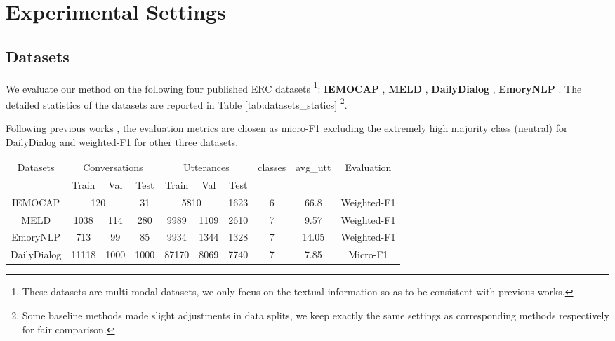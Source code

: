 \documentclass[letterpaper]{article} \usepackage{aaai22}  \usepackage{times}  \usepackage{helvet}  \usepackage{courier}  \usepackage[hyphens]{url}  \usepackage{graphicx} \urlstyle{rm} \def\UrlFont{\rm}  \usepackage{natbib}  \usepackage{caption} \DeclareCaptionStyle{ruled}{labelfont=normalfont,labelsep=colon,strut=off} \frenchspacing  \setlength{\pdfpagewidth}{8.5in}  \setlength{\pdfpageheight}{11in}
\begin{document}
\section{Experimental Settings}


\subsection{Datasets}

We evaluate our method on the following four published ERC datasets \footnote{These datasets are multi-modal datasets, we only focus on the textual information so as to be consistent with previous works.}: \textbf{IEMOCAP} \cite{busso2008iemocap}, \textbf{MELD} \cite{poria2019meld}, \textbf{DailyDialog} \cite{li2017dailydialog}, \textbf{EmoryNLP} \cite{zahiri2018emotion}. The detailed statistics of the datasets are reported in Table \ref{tab:datasets_statics} \footnote{ Some baseline methods made slight adjustments in data splits, we keep exactly the same settings as corresponding methods respectively for fair comparison.}.


Following previous works  \citep{ghosal2019dialoguegcn,zhong2019knowledge,ishiwatari2020relation}, the evaluation metrics are chosen as micro-F1  excluding the extremely high majority class (neutral) for DailyDialog and weighted-F1 for other three datasets.

\begin{table*}
	\centering
	\footnotesize
	\begin{tabular}{c|c|c|c|c|c|c|c|c|c}
		
		\toprule
		
		\multirow{2}{*}{Datasets} & \multicolumn{3}{c|}{Conversations}  & \multicolumn{3}{c|}{Utterances} & \multirow{2}{*}{classes} & \multirow{2}{*}{avg\_utt} & \multirow{2}{*}{Evaluation} \\ 
		& Train & Val & Test & Train & Val & Test & & & \\
		
		\midrule
		IEMOCAP& \multicolumn{2}{c|}{120} & 31& \multicolumn{2}{c|}{5810} &1623& 6 &66.8& Weighted-F1\\ 
		
		MELD & 1038 & 114 & 280 & 9989 & 1109 & 2610 & 7 & 9.57 &Weighted-F1\\ 
		EmoryNLP & 713 & 99 & 85 & 9934 & 1344 & 1328 & 7 & 14.05 &Weighted-F1\\ 
		DailyDialog & 11118 & 1000 & 1000 & 87170 & 8069 & 7740 & 7 & 7.85 & Micro-F1\\
		
		\bottomrule
	\end{tabular}
	\caption{The statistics of datasets.  denotes the average number of utterances. } \label{tab:datasets_statics}
\end{table*}
\end{document}

